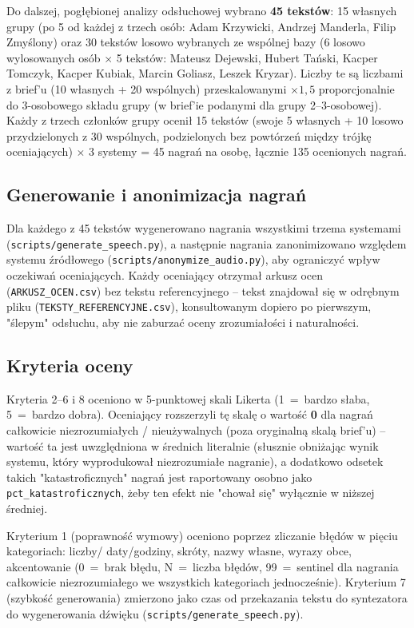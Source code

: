 \documentclass{article}
\begin{document}
Do dalszej, pogłębionej analizy odsłuchowej wybrano \textbf{45 tekstów}: 15 własnych grupy
(po 5 od każdej z trzech osób: Adam Krzywicki, Andrzej Manderla, Filip Zmyślony) oraz 30
tekstów losowo wybranych ze wspólnej bazy (6 losowo wylosowanych osób $\times$ 5 tekstów:
Mateusz Dejewski, Hubert Tański, Kacper Tomczyk, Kacper Kubiak, Marcin Goliasz, Leszek Kryzar).
Liczby te są liczbami z brief'u (10 własnych + 20 wspólnych) przeskalowanymi $\times 1{,}5$
proporcjonalnie do 3-osobowego składu grupy (w brief'ie podanymi dla grupy 2--3-osobowej).
Każdy z trzech członków grupy ocenił 15 tekstów (swoje 5 własnych + 10 losowo przydzielonych
z 30 wspólnych, podzielonych bez powtórzeń między trójkę oceniających) $\times$ 3 systemy =
45 nagrań na osobę, łącznie 135 ocenionych nagrań.

\subsection{Generowanie i anonimizacja nagrań}
Dla każdego z 45 tekstów wygenerowano nagrania wszystkimi trzema systemami
(\texttt{scripts/generate\_speech.py}), a następnie nagrania zanonimizowano względem systemu
źródłowego (\texttt{scripts/anonymize\_audio.py}), aby ograniczyć wpływ oczekiwań oceniających.
Każdy oceniający otrzymał arkusz ocen (\texttt{ARKUSZ\_OCEN.csv}) bez tekstu referencyjnego --
tekst znajdował się w odrębnym pliku (\texttt{TEKSTY\_REFERENCYJNE.csv}), konsultowanym
dopiero po pierwszym, "ślepym" odsłuchu, aby nie zaburzać oceny zrozumiałości i naturalności.

\subsection{Kryteria oceny}
Kryteria 2--6 i 8 oceniono w 5-punktowej skali Likerta (1~=~bardzo słaba, 5~=~bardzo dobra).
Oceniający rozszerzyli tę skalę o wartość \textbf{0} dla nagrań całkowicie niezrozumiałych /
nieużywalnych (poza oryginalną skalą brief'u) -- wartość ta jest uwzględniona w średnich
literalnie (słusznie obniżając wynik systemu, który wyprodukował niezrozumiałe nagranie), a
dodatkowo odsetek takich "katastroficznych" nagrań jest raportowany osobno jako
\texttt{pct\_katastroficznych}, żeby ten efekt nie "chował się" wyłącznie w niższej średniej.

Kryterium 1 (poprawność wymowy) oceniono poprzez zliczanie błędów w pięciu kategoriach: liczby/
daty/godziny, skróty, nazwy własne, wyrazy obce, akcentowanie (0~=~brak błędu, N~=~liczba
błędów, 99~=~sentinel dla nagrania całkowicie niezrozumiałego we wszystkich kategoriach
jednocześnie). Kryterium 7 (szybkość generowania) zmierzono jako czas od przekazania tekstu do
syntezatora do wygenerowania dźwięku (\texttt{scripts/generate\_speech.py}).
\end{document}
